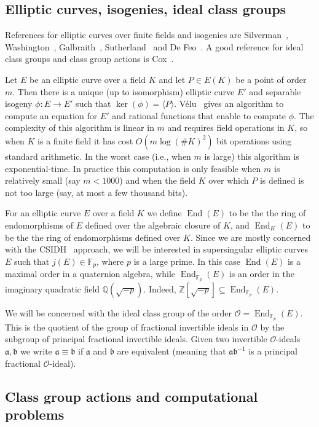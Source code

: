 \documentclass{llncs}
\newcommand{\F}{\mathbb{F}}
\newcommand{\OO}{\mathcal{O}}
\newcommand{\Q}{\mathbb{Q}}
\newcommand{\Z}{\mathbb{Z}}
\DeclareMathOperator{\End}{End}
\renewcommand{\a}{\mathfrak{a}}
\renewcommand{\b}{\mathfrak{b}}
\begin{document}
\subsection{Elliptic curves, isogenies, ideal class groups}


References for elliptic curves over finite fields and isogenies are Silverman~\cite{Sil86}, Washington~\cite{Was08}, Galbraith~\cite{Gal12}, Sutherland~\cite{Sut17} and De Feo~\cite{DF17}.
A good reference for ideal class groups and class group actions is Cox~\cite{Cox}.

Let $E$ be an elliptic curve over a field $K$ and let $P \in E( K )$ be a point of order $m$.
Then there is a unique (up to isomorphism) elliptic curve $E'$ and separable isogeny $\phi : E \to E'$ such that $\ker( \phi ) = \langle P \rangle$.
V{\' e}lu~\cite{velu71} gives an algorithm to compute an equation for $E'$ and rational functions that enable to compute $\phi$.
The complexity of this algorithm is linear in $m$ and requires field operations in $K$, so when $K$ is a finite field it has cost $O( m \log( \#K )^2 )$ bit operations using standard arithmetic.
In the worst case (i.e., when $m$ is large) this algorithm is exponential-time.
In practice this computation is only feasible when $m$ is relatively small (say $m < 1000$) and when the field $K$ over which $P$ is defined is not too large (say, at most a few thousand bits).

For an elliptic curve $E$ over a field $K$ we define $\End(E)$ to be the the ring of endomorphisms of $E$ defined over the algebraic closure of $K$, and $\End_K(E)$ to be the the ring of endomorphisms defined over $K$.
Since we are mostly concerned with the CSIDH~\cite{CLMPR18} approach, we will be interested in supersingular elliptic curves $E$ such that $j(E) \in \F_p$, where $p$ is a large prime.
In this case $\End( E )$ is a maximal order in a quaternion algebra, while $\End_{\F_p}(E)$ is an order in the imaginary quadratic field $\Q( \sqrt{-p} )$.
Indeed, $\Z[ \sqrt{-p} ] \subseteq \End_{\F_p}(E)$.

We will be concerned with the ideal class group of the order $\OO = \End_{\F_p}(E)$.
This is the quotient of the group of fractional invertible ideals in $\OO$ by the subgroup of principal fractional invertible ideals.
Given two invertible $\OO$-ideals $\a, \b$ we write $\a \equiv \b$ if $\a$ and $\b$ are equivalent (meaning that $\a \b^{-1}$ is a principal fractional $\OO$-ideal). 


 

\subsection{Class group actions and computational problems}
\end{document}
